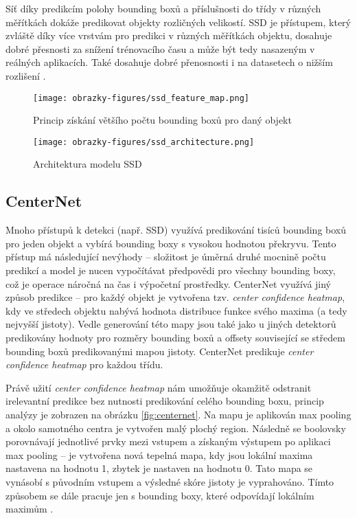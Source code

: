 Síť díky predikcím polohy bounding boxů a příslušnosti do třídy v různých měřítkách dokáže predikovat objekty rozličných velikostí. SSD je přístupem, který zvláště díky více vrstvám pro predikci v různých měřítkách objektu, dosahuje dobré přesnosti za snížení trénovacího času a může být tedy nasazeným v reálných aplikacích. Také dosahuje dobré přenosnosti i na datasetech o nižším rozlišení \cite{SSD, SSDFasterR-CNNComparison}.

\begin{figure}[!htbp]
    \centering
    \texttt{[image: obrazky-figures/ssd\_feature\_map.png]}
    \caption{Princip získání většího počtu bounding boxů pro daný objekt \cite{SSD}}
    \label{fig:ssdfeaturemap}
\end{figure} 

\begin{figure}[!htbp]
    \centering
    \texttt{[image: obrazky-figures/ssd\_architecture.png]}
    \caption{Architektura modelu SSD \cite{SSD}}
    \label{fig:ssdarchitecture}
\end{figure} 

\subsection{CenterNet}
Mnoho přístupů k detekci (např. SSD) využívá predikování tisíců bounding boxů pro jeden objekt a vybírá bounding boxy s vysokou hodnotou překryvu. Tento přístup má následující nevýhody -- složitost je úměrná druhé mocnině počtu predikcí a model je nucen vypočítávat předpovědi pro všechny bounding boxy, což je operace náročná na čas i výpočetní prostředky. CenterNet využívá jiný způsob predikce -- pro každý objekt je vytvořena tzv. \textit{center confidence heatmap}, kdy ve středech objektu nabývá hodnota distribuce funkce svého maxima (a tedy nejvyšší jistoty). Vedle generování této mapy jsou také jako u jiných detektorů predikovány hodnoty pro rozměry bounding boxů a offsety související se středem bounding boxů predikovanými mapou jistoty. CenterNet predikuje \textit{center confidence heatmap} pro každou třídu.

Právě užití \textit{center confidence heatmap} nám umožňuje okamžitě odstranit irelevantní predikce bez nutnosti predikování celého bounding boxu, princip analýzy je zobrazen na obrázku \ref{fig:centernet}. Na mapu je aplikován max pooling a okolo samotného centra je vytvořen malý plochý region. Následně se boolovsky porovnávají jednotlivé prvky mezi vstupem a získaným výstupem po aplikaci max pooling -- je vytvořena nová tepelná mapa, kdy jsou lokální maxima nastavena na hodnotu 1, zbytek je nastaven na hodnotu 0. Tato mapa se vynásobí s původním vstupem a výsledné skóre jistoty je vyprahováno. Tímto způsobem se dále pracuje jen s bounding boxy, které odpovídají lokálním maximům \cite{CenterNet}.

